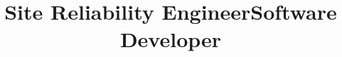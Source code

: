\begin{resume}
\title{Site Reliability Engineer}
\begin{position}
\end{position}

\title{Software Developer}
\begin{position}
\end{position}


\end{resume}

